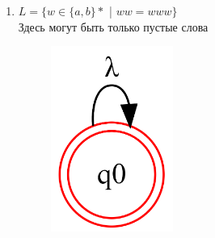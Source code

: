 \documentclass[a4paper]{article}
\begin{document}
\begin{enumerate}
\item {$L = \{ w \in \{a,b\}*$ | $  {ww = www} \}$} \\
Здесь могут быть только пустые слова 
\begin{figure}[h]
\centering
\includegraphics[width=4cm]{Задание_№1_4.png}
\end{figure}
\end{enumerate}
\newpage


\newpage
\end{document}
